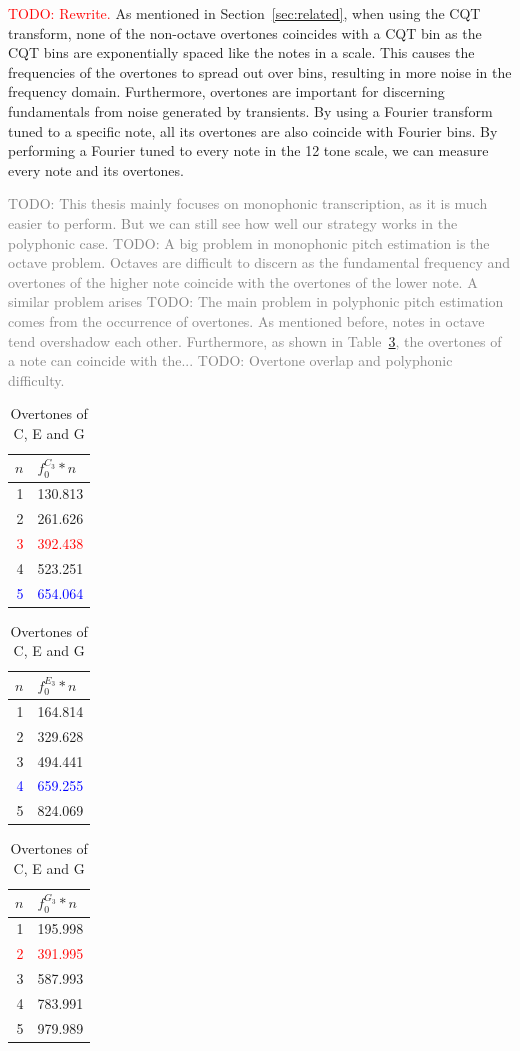 \documentclass[10pt,twocolumn]{article}
\begin{document}
\textcolor{red}{TODO: Rewrite.}
As mentioned in Section~\ref{sec:related}, when using the CQT transform, none of the non-octave overtones coincides with a CQT bin as the CQT bins are exponentially spaced like the notes in a scale. This causes the frequencies of the overtones to spread out over bins, resulting in more noise in the frequency domain. Furthermore, overtones are important for discerning fundamentals from noise generated by transients. By using a Fourier transform tuned to a specific note, all its overtones are also coincide with Fourier bins. By performing a Fourier tuned to every note in the 12 tone scale, we can measure every note and its overtones.

\textcolor{gray}{TODO: This thesis mainly focuses on monophonic transcription, as it is much easier to perform. But we can still see how well our strategy works in the polyphonic case.
TODO: A big problem in monophonic pitch estimation is the octave problem. Octaves are difficult to discern as the fundamental frequency and overtones of the higher note coincide with the overtones of the lower note. A similar problem arises
TODO: The main problem in polyphonic pitch estimation comes from the occurrence of overtones. As mentioned before, notes in octave tend overshadow each other. Furthermore, as shown in Table~\ref{tab:overtones}, the overtones of a note can coincide with the...
TODO: Overtone overlap and polyphonic difficulty.}
\begin{table}[H]
    \centering
    \hfill
    \begin{tabular}{r|l}
        $n$ & $f^{C_3}_0*n$ \\
        \hline
        1 & 130.813 \\
        2 & 261.626 \\
        \textcolor{red}{3} & \textcolor{red}{392.438} \\
        4 & 523.251 \\
        \textcolor{blue}{5} & \textcolor{blue}{654.064}
    \end{tabular}
    \hfill
    \begin{tabular}{r|l}
        $n$ & $f^{E_3}_0*n$ \\
        \hline
        1 & 164.814 \\
        2 & 329.628 \\
        3 & 494.441 \\
        \textcolor{blue}{4} & \textcolor{blue}{659.255} \\
        5 & 824.069
    \end{tabular}
    \hfill
    \begin{tabular}{r|l}
        $n$ & $f^{G_3}_0*n$ \\
        \hline
        1 & 195.998 \\
        \textcolor{red}{2} & \textcolor{red}{391.995} \\
        3 & 587.993 \\
        4 & 783.991 \\
        5 & 979.989
    \end{tabular}
    \hfill
    \caption{Overtones of C, E and G}
    \label{tab:overtones}
\end{table}
\end{document}
